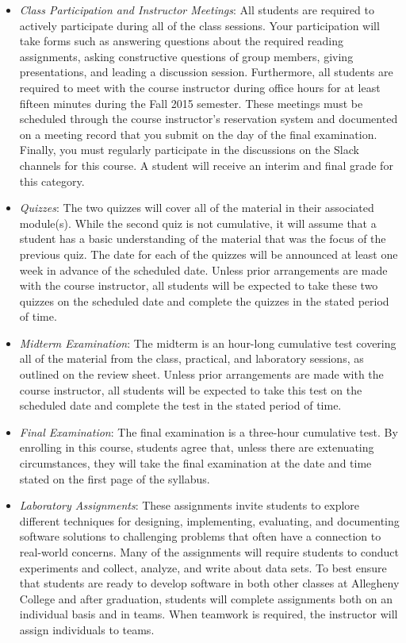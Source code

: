 \begin{itemize}

  \item {\em Class Participation and Instructor Meetings}: All students are required to actively participate during all
    of the class sessions. Your participation will take forms such as answering questions about the required reading
    assignments, asking constructive questions of group members, giving presentations, and leading a discussion session.
    Furthermore, all students are required to meet with the course instructor during office hours for at least fifteen
    minutes during the Fall 2015 semester.  These meetings must be scheduled through the course instructor's reservation
    system and documented on a meeting record that you submit on the day of the final examination. Finally, you must
    regularly participate in the discussions on the Slack channels for this course. A student will receive an interim
    and final grade for this category.

  \item {\em Quizzes}: The two quizzes will cover all of the material in their associated module(s).  While the second
    quiz is not cumulative, it will assume that a student has a basic understanding of the material that
    was the focus of the previous quiz.  The date for each of the quizzes will be announced at least one week in
    advance of the scheduled date.  Unless prior arrangements are made with the course instructor, all students will be
    expected to take these two quizzes on the scheduled date and complete the quizzes in the stated period of time.

  \item {\em Midterm Examination}: The midterm is an hour-long cumulative test covering all of the material from the
    class, practical, and laboratory sessions, as outlined on the review sheet. Unless prior arrangements are made with
    the course instructor, all students will be expected to take this test on the scheduled date and complete the test
    in the stated period of time.

  \item {\em Final Examination}: The final examination is a three-hour cumulative test.  By enrolling in this
    course, students agree that, unless there are extenuating circumstances, they will take the final examination
    at the date and time stated on the first page of the syllabus.

  \item {\em Laboratory Assignments}: These assignments invite students to explore different techniques for designing,
    implementing, evaluating, and documenting software solutions to challenging problems that often have a connection to
    real-world concerns.  Many of the assignments will require students to conduct experiments and collect, analyze, and
    write about data sets.  To best ensure that students are ready to develop software in both other classes at
    Allegheny College and after graduation, students will complete assignments both on an individual basis and in teams.
    When teamwork is required, the instructor will assign individuals to teams.


\end{itemize}
